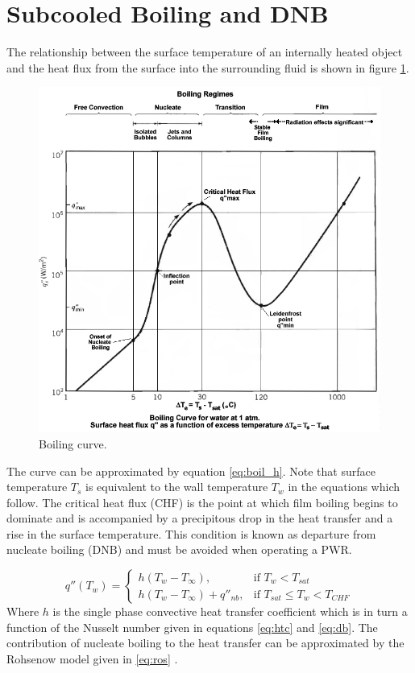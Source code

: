 \section{Subcooled Boiling and DNB}

The relationship between the surface temperature of an internally heated object and the heat flux from the surface into the surrounding fluid is shown in figure \ref{fig:boiling_curve}.

\begin{figure}[H]
    \centering
    \includegraphics[width=0.7\linewidth]{../proposal/images/boiling_curve}
    \caption{Boiling curve.}
    \label{fig:boiling_curve}
\end{figure}


The curve can be approximated by equation \ref{eq:boil_h}.  Note that surface temperature $T_s$ is equivalent to the wall temperature $T_w$ in the equations which follow.
The critical heat flux (CHF) is the point at which film boiling begins to dominate and is accompanied by a precipitous drop in the heat transfer and a rise in the surface temperature.  This condition is known as departure from nucleate boiling (DNB) and must be avoided when operating a PWR.

\begin{equation}
q''(T_w) = 
\begin{cases}
      h(T_w-T_{\infty}), & \mbox{if } T_w < T_{sat} \\
      h(T_w-T_{\infty}) + q''_{nb} ,  & \mbox{if } T_{sat} \leq T_w < T_{CHF} 
\end{cases}
\label{eq:boil_h}
\end{equation}
Where $h$ is the single phase convective heat transfer coefficient which is in turn a function of the Nusselt number given in equations \ref{eq:htc} and \ref{eq:db}.  The contribution of nucleate boiling to the heat transfer can be approximated by the Rohsenow model given in \ref{eq:ros} \cite{rohsenow51}.


